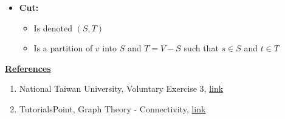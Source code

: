 \documentclass[12pt]{article}
\begin{document}
\begin{enumerate}[1.]
\begin{itemize}
        \item \textbf{Cut:}

        \begin{itemize}
            \item Is denoted $(S,T)$
            \item Is a partition of $v$ into $S$ and $T = V - S$ such that $s \in S$ and
            $t \in T$
        \end{itemize}
    \end{itemize}

    \bigskip

    \underline{\textbf{References}}

    \bigskip

    \begin{enumerate}[1)]
        \item National Taiwan University, Voluntary Exercise 3, \href{https://www.csie.ntu.edu.tw/~r95122/alg07spr/alg07spr_hw3sol.pdf}{link}
        \item TutorialsPoint, Graph Theory - Connectivity, \href{https://www.tutorialspoint.com/graph_theory/graph_theory_connectivity.htm}{link}
    \end{enumerate}

\end{enumerate}
\end{document}
